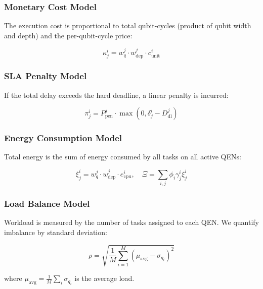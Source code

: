 \documentclass[12pt,a4paper]{article}
\begin{document}
\subsubsection{Monetary Cost Model}

The execution cost is proportional to total qubit-cycles (product of qubit width and depth) and the per-qubit-cycle price:

\begin{equation}
\kappa^i_j = w^j_q \cdot w^j_{\text{dep}} \cdot c^i_{\text{unit}}
\end{equation}

\subsubsection{SLA Penalty Model}

If the total delay exceeds the hard deadline, a linear penalty is incurred:

\begin{equation}
\pi^i_j = P^j_{\text{pen}} \cdot \max(0, \delta^i_j - D^j_{\text{dl}})
\end{equation}

\subsubsection{Energy Consumption Model}

Total energy is the sum of energy consumed by all tasks on all active QENs:

\begin{equation}
\xi^i_j = w^j_q \cdot w^j_{\text{dep}} \cdot e^i_{\text{cpu}}, \quad \Xi = \sum_{i,j} \phi_i \gamma^i_j \xi^i_j
\end{equation}

\subsubsection{Load Balance Model}

Workload is measured by the number of tasks assigned to each QEN. We quantify imbalance by standard deviation:

\begin{equation}
\rho = \sqrt{\frac{1}{M}\sum_{i=1}^{M}(\mu_{\text{avg}} - \sigma_{q_i})^2}
\end{equation}

where $\mu_{\text{avg}} = \frac{1}{M}\sum_i \sigma_{q_i}$ is the average load.

\end{document}
